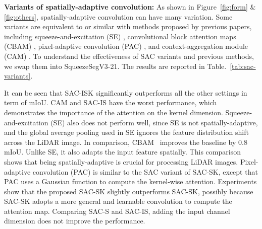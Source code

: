 \documentclass[runningheads]{llncs}
\begin{document}
\begin{table}[!t]

\caption{mIoU [\%] and Accuracy [\%] for variants of spatially-adaptive convolution}
\label{tab:sac-variants}
\end{table}

\noindent\textbf{Variants of spatially-adaptive convolution:} As shown in Figure~\ref{fig:form} \& \ref{fig:others}, spatially-adaptive convolution can have many variation. Some variants are equivalent to or similar with methods proposed by previous papers, including squeeze-and-excitation (SE) \cite{hu2018squeeze}, convolutional block attention maps (CBAM) \cite{woo2018cbam}, pixel-adaptive convolution (PAC) \cite{su2019pixel}, and context-aggregation module (CAM) \cite{wu2018squeezesegv2}. To understand the effectiveness of SAC variants and previous methods, we swap them into SqueezeSegV3-21. The results are reported in Table.~\ref{tab:sac-variants}. 

It can be seen that SAC-ISK significantly outperforms all the other settings in term of mIoU. CAM and SAC-IS have the worst performance, which demonstrates the importance of the attention on the kernel dimension. Squeeze-and-excitation (SE) also does not perform well, since SE is not spatially-adaptive, and the global average pooling used in SE ignores the feature distribution shift across the LiDAR image. In comparison, CBAM~\cite{woo2018cbam} improves the baseline by 0.8 mIoU. Unlike SE, it also adapts the input feature spatially. This comparison shows that being spatially-adaptive is crucial for processing LiDAR images. Pixel-adaptive convolution (PAC) is similar to the SAC variant of SAC-SK, except that PAC uses a Gaussian function to compute the kernel-wise attention. Experiments show that the proposed SAC-SK slightly outperforms SAC-SK, possibly because SAC-SK adopts a more general and learnable convolution to compute the attention map. Comparing SAC-S and SAC-IS, adding the input channel dimension does not improve the performance.
\end{document}
